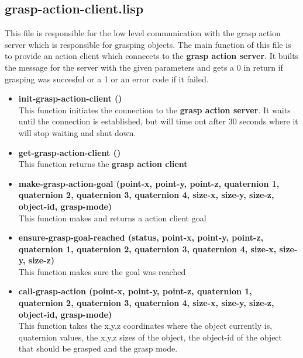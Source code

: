 \documentclass[main.tex]{subfiles}
\begin{document}
		\subsection{grasp-action-client.lisp}
		This file is responsible for the low level communication with the
		grasp action server which is responsible for grasping objects. The main function of this file is to provide an action client which connecets to the \textbf{grasp action server}. It builts the message for the server with the given parameters and gets a 0 in return if grasping was succesful or a 1  or an error code if it failed.
		\begin{itemize}
			\item \textbf{init-grasp-action-client ()} \\
			This function initiates the connection to the \textbf{grasp action server}. It waits until the connection is established, but will time out after 30 seconds where it will stop waiting and shut down. 
			\item \textbf{get-grasp-action-client ()} \\
			This function returns the \textbf{grasp action client}
			\item \textbf{make-grasp-action-goal (point-x, point-y, point-z, quaternion 1, quaternion 2, quaternion 3, quaternion 4, size-x, size-y, size-z, object-id, grasp-mode)} \\
			This function makes and returns a action client goal
			\item \textbf{ensure-grasp-goal-reached (status, point-x, point-y, point-z, quaternion 1, quaternion 2, quaternion 3, quaternion 4, size-x, size-y, size-z)} \\
            This function makes sure the goal was reached
			\item \textbf{call-grasp-action (point-x, point-y, point-z, quaternion 1, quaternion 2, quaternion 3, quaternion 4, size-x, size-y, size-z, object-id, grasp-mode)} \\
			This function takes the x,y,z coordinates where the object currently is, quaternion values, the x,y,z sizes of the object, the object-id of the object that should be grasped and the grasp mode.
		\end{itemize}
\end{document}
